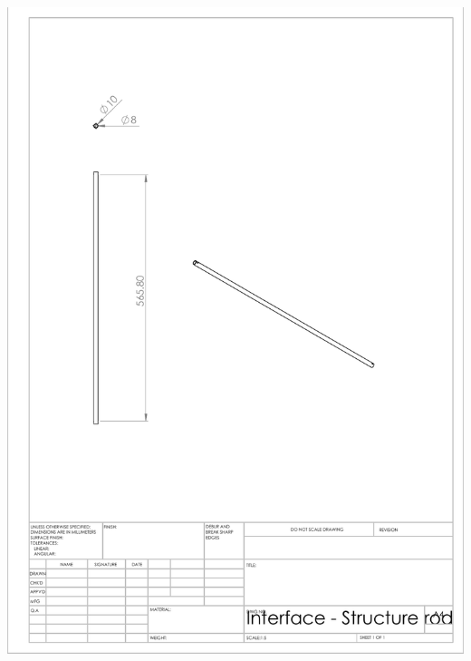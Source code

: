 \begin{appendices}
        \includegraphics[width=\linewidth]{chapters/cha_appendices/interface_tructure_rod}
        \break

\end{appendices}
